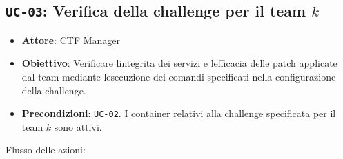 \subsection{\texorpdfstring{\texttt{UC-03}: Verifica della challenge per
il team
\(k\)}{UC-03: Verifica della challenge per il team k}}\label{uc-03-verifica-della-challenge-per-il-team-k}

\begin{itemize}
\tightlist
\item
  \textbf{Attore}: CTF Manager
\item
  \textbf{Obiettivo}: Verificare l\textquotesingle integrita dei servizi
  e l\textquotesingle efficacia delle patch applicate dal team mediante
  l\textquotesingle esecuzione dei comandi specificati nella
  configurazione della challenge.
\item
  \textbf{Precondizioni}: \passthrough{\lstinline!UC-02!}. I container
  relativi alla challenge specificata per il team \(k\) sono attivi.
\end{itemize}

Flusso delle azioni:

